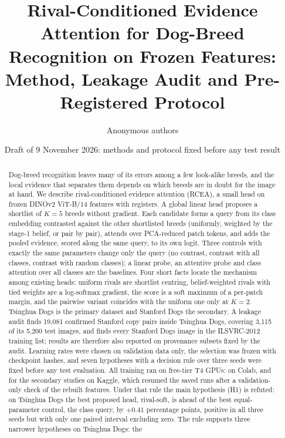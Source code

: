 \documentclass[11pt,a4paper]{article}
\title{Rival-Conditioned Evidence Attention for Dog-Breed Recognition on Frozen Features:\\
Method, Leakage Audit and Pre-Registered Protocol}
\author{Anonymous authors}
\date{Draft of 9 November 2026: methods and protocol fixed before any test result}
\theoremstyle{plain}
\begin{document}
\maketitle

\begin{abstract}
Dog-breed recognition leaves many of its errors among a few look-alike breeds, and the local evidence that
separates them depends on which breeds are in doubt for the image at hand. We describe rival-conditioned evidence
attention (RCEA), a small head on frozen DINOv2 ViT-B/14 features with registers. A global linear head proposes a
shortlist of $K=5$ breeds without gradient. Each candidate forms a query from its class embedding contrasted
against the other shortlisted breeds (uniformly, weighted by the stage-1 belief, or pair by pair), attends over
PCA-reduced patch tokens, and adds the pooled evidence, scored along the same query, to its own logit. Three
controls with exactly the same parameters change only the query (no contrast, contrast with all classes, contrast
with random classes); a linear probe, an attentive probe and class attention over all classes are the baselines.
Four short facts locate the mechanism among existing heads: uniform rivals are shortlist centring, belief-weighted
rivals with tied weights are a log-softmax gradient, the score is a soft maximum of a per-patch margin, and the
pairwise variant coincides with the uniform one only at $K=2$. Tsinghua Dogs is the primary dataset and Stanford
Dogs the secondary. A leakage audit finds 19,081 confirmed Stanford copy pairs inside Tsinghua Dogs, covering 3,115
of its 5,200 test images, and finds every Stanford Dogs image in the ILSVRC-2012 training list; results are
therefore also reported on provenance subsets fixed by the audit. Learning rates were chosen on validation data
only, the selection was frozen with checkpoint hashes, and seven hypotheses with a decision rule over three seeds
were fixed before any test evaluation. All training ran on free-tier T4 GPUs: on Colab, and for the secondary
studies on Kaggle, which resumed the saved runs after a validation-only check of the rebuilt features.
Under that rule the main hypothesis (H1) is refuted: on Tsinghua Dogs the best proposed head, rival-soft, is ahead
of the best equal-parameter control, the class query, by $+0.41$ percentage points, positive in all three seeds but
with only one paired interval excluding zero. The rule supports three narrower hypotheses on Tsinghua Dogs: the

\end{abstract}
\end{document}
